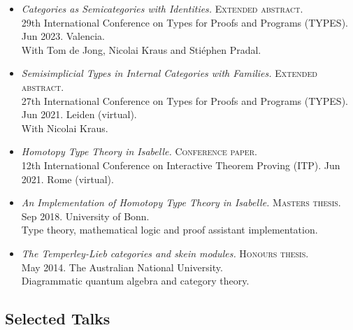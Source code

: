 \documentclass[12pt,a4paper]{article}
\begin{document}
\begin{itemize}
\item
  \emph{Categories as Semicategories with Identities.}
  \textsc{Extended abstract.}\\
  29th International Conference on Types for Proofs and Programs (TYPES).
  Jun 2023.
  Valencia.\\
  With Tom de Jong, Nicolai Kraus and Stiéphen Pradal.\\
\item
  \emph{Semisimplicial Types in Internal Categories with Families.}
  \textsc{Extended abstract.}\\
  27th International Conference on Types for Proofs and Programs (TYPES).
  Jun 2021.
  Leiden (virtual).\\
  With Nicolai Kraus.\\
\item
  \emph{Homotopy Type Theory in Isabelle.}
  \textsc{Conference paper.}\\
  12th International Conference on Interactive Theorem Proving (ITP).
  Jun 2021.
  Rome (virtual).\\
\item
  \emph{An Implementation of Homotopy Type Theory in Isabelle.}
  \textsc{Masters thesis.}\\
  Sep 2018.
  University of Bonn.\\
  Type theory, mathematical logic and proof assistant implementation.\\
\item
  \emph{The Temperley-Lieb categories and skein modules.}
  \textsc{Honours thesis.}\\
  May 2014.
  The Australian National University.\\
  Diagrammatic quantum algebra and category theory.\\
\end{itemize}

\subsection{Selected Talks}

\newcommand{\vidicon}{{\scriptsize\faVideo}}
\newcommand{\slidesicon}{{\scriptsize\faDesktop}}
\newcommand{\vid}[1]{\vidicon\hspace{0.8ex}\httpsurl{#1}}
\newcommand{\slides}[1]{\slidesicon\hspace{0.8ex}\httpsurl{#1}}
\end{document}
